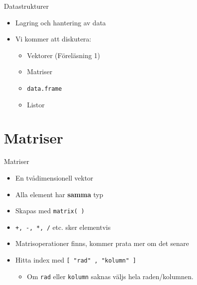 \documentclass[
  11pt,
  ignorenonframetext,
]{beamer}
\providecommand{\tightlist}{%
  \setlength{\itemsep}{0pt}\setlength{\parskip}{0pt}}
\newcommand\imp[1]{\alert{\textbf{#1}}}
\begin{document}
\begin{frame}{Datastrukturer}
\label{datastrukturer-1}
\begin{itemize}
\tightlist
\item
  Lagring och hantering av data
\item
  Vi kommer att diskutera:

  \begin{itemize}
  \tightlist
  \item
    Vektorer (Föreläsning 1)
  \item
    Matriser
  \item
    \texttt{data.frame}
  \item
    Listor
  \end{itemize}
\end{itemize}
\end{frame}

\section{Matriser}\label{matriser}

\begin{frame}{Matriser}
\label{matriser-1}
\begin{itemize}
\tightlist
\item
  En tvådimensionell vektor
\item
  Alla element har \imp{samma} typ
\item
  Skapas med \texttt{matrix( )}
\item
  \texttt{+, -, *, /} etc. sker elementvis
\item
  Matrisoperationer finns, kommer prata mer om det senare
\item
  Hitta index med \texttt{[ "rad" , "kolumn" ]}

  \begin{itemize}
  \tightlist
  \item
    Om \texttt{rad} eller \texttt{kolumn} saknas väljs hela
    raden/kolumnen.
  \end{itemize}
\end{itemize}
\end{frame}
\end{document}
